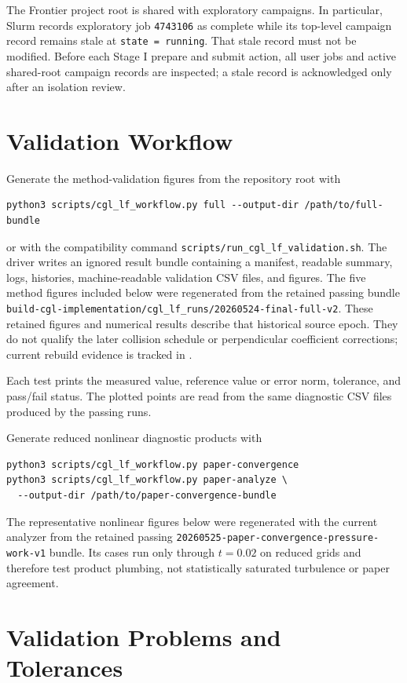 \documentclass[11pt]{article}
\begin{document}
The Frontier project root is shared with exploratory campaigns.  In
particular, Slurm records exploratory job \texttt{4743106} as complete while
its top-level campaign record remains stale at \texttt{state = running}.
That stale record must not be modified.  Before each Stage I prepare and
submit action, all user jobs and active shared-root campaign records are
inspected; a stale record is acknowledged only after an isolation review.

\section{Validation Workflow}

Generate the method-validation figures from the repository root with
\begin{verbatim}
python3 scripts/cgl_lf_workflow.py full --output-dir /path/to/full-bundle
\end{verbatim}
or with the compatibility command
\texttt{scripts/run\_cgl\_lf\_validation.sh}.  The driver writes an ignored
result bundle containing a manifest, readable summary, logs, histories,
machine-readable validation CSV files, and figures.  The five method figures
included below were regenerated from the retained passing bundle
\texttt{build-cgl-implementation/cgl\_lf\_runs/20260524-final-full-v2}.
These retained figures and numerical results describe that historical source
epoch.  They do not qualify the later collision schedule or perpendicular
coefficient corrections; current rebuild evidence is tracked in
.

Each test prints the measured value, reference value or error norm, tolerance,
and pass/fail status.  The plotted points are read from the same diagnostic CSV
files produced by the passing runs.

Generate reduced nonlinear diagnostic products with
\begin{verbatim}
python3 scripts/cgl_lf_workflow.py paper-convergence
python3 scripts/cgl_lf_workflow.py paper-analyze \
  --output-dir /path/to/paper-convergence-bundle
\end{verbatim}
The representative nonlinear figures below were regenerated with the current
analyzer from the retained passing
\texttt{20260525-paper-convergence-pressure-work-v1} bundle.  Its cases run
only through \(t=0.02\) on reduced grids and therefore test product plumbing,
not statistically saturated turbulence or paper agreement.

\section{Validation Problems and Tolerances}
\end{document}
